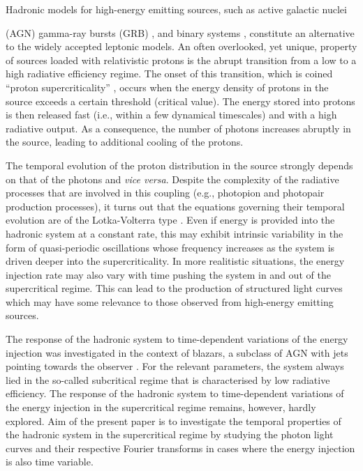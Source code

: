 \documentclass[fleqn,usenatbib]{mnras}
\begin{document}
Hadronic models for high-energy emitting sources, such as active galactic nuclei {(AGN) \citep[e.g.][]{sikora87, mannheim93, rachen98, aharonian00, mueckeprotheroe01} gamma-ray bursts (GRB) \citep[][]{waxman97,boettcherdermer98, kazanas02, murasenagataki06, asano07}, and binary systems \citep[e.g.][]{romero03, romero05, vieyro12},
constitute an alternative to the widely accepted leptonic models. 
An often overlooked, yet unique, property of sources loaded with relativistic protons
is the abrupt transition from a low to a high radiative efficiency regime. The onset of this transition, which is coined 
``proton supercriticality'' \citep{kirkmast92},
occurs when the energy density of protons in the source exceeds a certain threshold (critical value). 
The energy stored into protons is then released fast  (i.e., within a few dynamical timescales) and with a high radiative output. 
As a consequence, the number of photons increases abruptly in the source, leading to additional cooling of the protons. 

The temporal evolution of the proton distribution in the source strongly depends on that of the photons and {\it vice versa}. Despite the complexity
of the radiative processes that are involved in this coupling (e.g., photopion and photopair production processes), it turns out that the equations
governing their temporal evolution are of the Lotka-Volterra type \citep{petromast12b}. Even if energy is provided into the hadronic system at a constant rate, this may exhibit intrinsic variability in the form of quasi-periodic oscillations whose frequency increases as the system is driven deeper into the supercriticality. In  more realitistic situations, the energy injection rate may also vary with time pushing the system in and out of the supercritical regime. This can lead to the production of structured light curves which may have some relevance to those observed from high-energy emitting sources. 

The response of the hadronic system to time-dependent variations of the energy injection was investigated in the context of blazars, a subclass of AGN with jets pointing towards the observer \citep{mpd13}. For the relevant parameters, the system always lied in the so-called subcritical regime that is characterised by low radiative efficiency. The response of the hadronic system to time-dependent variations of the energy injection in the supercritical regime remains, however, hardly explored. Aim of the present paper is to investigate the temporal properties of the hadronic system  in the supercritical regime by studying the photon light curves and their respective Fourier transforms in cases where the energy injection is also time variable. 

}
\end{document}

